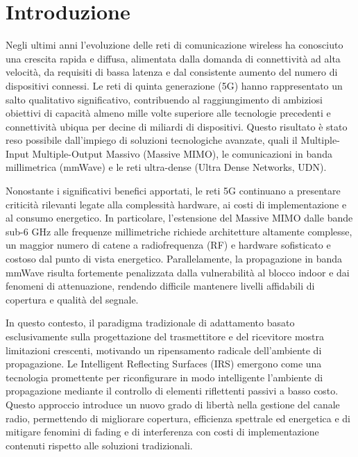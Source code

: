 \documentclass[12pt,a4paper]{report}
\begin{document}
\chapter*{Introduzione}
\label{chap:introduzione}

Negli ultimi anni l'evoluzione delle reti di comunicazione wireless
ha conosciuto una crescita rapida e diffusa, alimentata dalla domanda
di connettività ad alta velocità, da requisiti di bassa latenza e dal
consistente aumento del numero di dispositivi connessi. Le reti di
quinta generazione (5G) hanno rappresentato un salto qualitativo
significativo, contribuendo al raggiungimento di ambiziosi obiettivi
di capacità almeno mille volte superiore alle tecnologie precedenti e
connettività ubiqua per decine di miliardi di dispositivi. Questo
risultato è stato reso possibile dall'impiego di soluzioni
tecnologiche avanzate, quali il Multiple-Input Multiple-Output
Massivo (Massive MIMO), le comunicazioni in banda millimetrica
(mmWave) e le reti ultra-dense (Ultra Dense Networks, UDN).

Nonostante i significativi benefici apportati, le reti 5G continuano
a presentare criticità rilevanti legate alla complessità hardware, ai
costi di implementazione e al consumo energetico. In particolare,
l'estensione del Massive MIMO dalle bande sub-6 GHz alle frequenze
millimetriche richiede architetture altamente complesse, un maggior
numero di catene a radiofrequenza (RF) e hardware sofisticato e
costoso dal punto di vista energetico. Parallelamente, la
propagazione in banda mmWave risulta fortemente penalizzata dalla
vulnerabilità al blocco indoor e dai fenomeni di attenuazione,
rendendo difficile mantenere livelli affidabili di copertura e
qualità del segnale.

In questo contesto, il paradigma tradizionale di adattamento basato
esclusivamente sulla progettazione del trasmettitore e del ricevitore
mostra limitazioni crescenti, motivando un ripensamento radicale
dell'ambiente di propagazione. Le Intelligent Reflecting Surfaces
(IRS) emergono come una tecnologia promettente per riconfigurare in
modo intelligente l'ambiente di propagazione mediante il controllo di
elementi riflettenti passivi a basso costo. Questo approccio
introduce un nuovo grado di libertà nella gestione del canale radio,
permettendo di migliorare copertura, efficienza spettrale ed
energetica e di mitigare fenomini di fading e di interferenza con
costi di implementazione contenuti rispetto alle soluzioni tradizionali.
\end{document}
